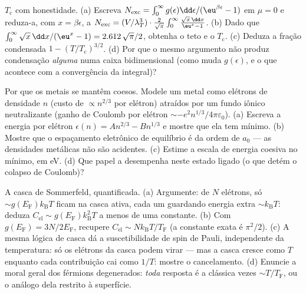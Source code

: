 \begin{exercise}[$\star\star\star$]\label{exo:b3:quantum-statistics:10}
$T_{\text{c}}$ com honestidade. (a) Escreva $N_{\text{exc}} = \int_0^\infty
g(\epsilon)\dd\epsilon/(\eu^{\beta\epsilon} - 1)$ em $\mu = 0$ e
reduza-a, com $x = \beta\epsilon$, a $N_{\text{exc}} =
(V/\lambda_T^3)\cdot\frac{2}{\sqrt\pi}\int_0^\infty\frac{\sqrt
x\,\dd x}{\eu^x - 1}$. (b) Dado que $\int_0^\infty\sqrt x\,\dd x/(
\eu^x - 1) = 2.612\,\sqrt\pi/2$, obtenha o teto e o
$T_{\text{c}}$. (c) Deduza a fração condensada $1 -
(T/T_{\text{c}})^{3/2}$. (d) Por que o mesmo argumento não produz
condensação \emph{alguma} numa caixa bidimensional (como muda $g(
\epsilon)$, e o que acontece com a convergência da
integral)?
\end{exercise}

\begin{exercise}[$\star\star\star$]\label{exo:b3:quantum-statistics:11}
Por que os metais se mantêm coesos. Modele um metal como elétrons de
densidade $n$ (custo de  $\propto n^{2/3}$ por elétron)
atraídos por um fundo iônico neutralizante (ganho de Coulomb por elétron
$\sim -e^2n^{1/3}/4\pi\varepsilon_0$). (a) Escreva a energia por
elétron $\epsilon(n) = An^{2/3} - Bn^{1/3}$ e mostre que ela tem
mínimo. (b) Mostre que o espaçamento eletrônico de equilíbrio é da ordem
de $a_0$ --- as densidades metálicas não são acidentes. (c) Estime
a escala de energia coesiva no mínimo, em eV. (d) Que papel a
 desempenha neste estado ligado (o que
detém o colapso de Coulomb)?
\end{exercise}

\begin{exercise}[$\star\star\star$]\label{exo:b3:quantum-statistics:12}
A casca de Sommerfeld, quantificada. (a) Argumente: de $N$ elétrons, só
$\sim g(E_{\text{F}})k_{\text{B}}T$ ficam na casca ativa, cada um
guardando energia extra $\sim k_{\text{B}}T$: deduza $C_{\text{el}}
\sim g(E_{\text{F}})k_{\text{B}}^2T$ a menos de uma constante. (b) Com
$g(E_{\text{F}}) = 3N/2E_{\text{F}}$, recupere $C_{\text{el}} \sim
Nk_{\text{B}}T/T_{\text{F}}$ (a constante exata é $\pi^2/2$).
(c) A mesma lógica de casca dá a suscetibilidade de spin de Pauli,
independente da temperatura: só os elétrons da casca podem virar --- mas
a casca cresce como $T$ enquanto cada contribuição cai como $1/T$: mostre
o cancelamento. (d) Enuncie a moral geral dos férmions degenerados:
\emph{toda} resposta é a clássica vezes
$\sim T/T_{\text{F}}$, ou o análogo dela restrito à superfície.
\end{exercise}

